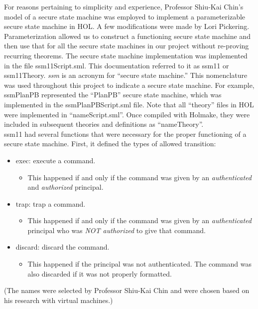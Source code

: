 For reasons pertaining to simplicity and experience, Professor Shiu-Kai Chin’s model of
a secure state machine was employed to implement a parameterizable secure state machine in
HOL. A few modifications were made by Lori Pickering. Parameterization allowed us to construct
a functioning secure state machine and then use that for all the secure state machines in our
project without re-proving recurring theorems. The secure state machine implementation was
implemented in the file ssm11Script.sml. This documentation referred to it as ssm11 or ssm11Theory.
\textit{ssm} is an acronym for “secure state machine.” This nomenclature was used throughout this project
to indicate a secure state machine. For example, ssmPlanPB represented the “PlanPB” secure state
machine, which was implemented in the ssmPlanPBScript.sml file. Note that all “theory” files in
HOL were implemented in “nameScript.sml”. Once compiled with Holmake, they were included in
subsequent theories and definitions as “nameTheory”.\\

ssm11 had several functions that were necessary for the proper functioning of a secure state machine.
First, it defined the types of allowed transition:
\begin{itemize}
\item exec: execute a command.
  \begin{itemize}
    \item This happened if and only if the command was given by an \textit{authenticated} and \textit{authorized} principal.
    \end{itemize}
  \item trap: trap a command.
    \begin{itemize}
    \item This happened if and only if the command was given by an \textit{authenticated} principal
      who was \textit{NOT authorized} to give that command.
    \end{itemize}
  \item discard: discard the command.
    \begin{itemize}
    \item This happened if the principal was not authenticated. The command was also discarded
      if it was not properly formatted.
    \end{itemize}
  \end{itemize}
  (The names were selected by Professor Shiu-Kai Chin and were chosen based on his research with
  virtual machines.)\\

